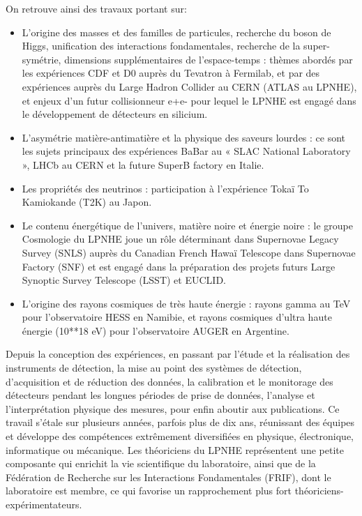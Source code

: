 \documentclass[french,a4paper,12pt]{report}
\begin{document}
  On retrouve ainsi des travaux portant sur:  
  \begin{itemize}
  \item L'origine des masses et des familles de particules, recherche du boson de Higgs, unification des interactions fondamentales, recherche de la super-symétrie, dimensions supplémentaires de l’espace-temps : thèmes abordés par les expériences CDF et D0 auprès du Tevatron à Fermilab, et par des expériences auprès du Large Hadron Collider au CERN (ATLAS au LPNHE), et enjeux d’un futur collisionneur e+e- pour lequel le LPNHE est engagé dans le développement de détecteurs en silicium.
  
  \item L’asymétrie matière-antimatière et la physique des saveurs lourdes : ce sont les sujets principaux des expériences BaBar au « SLAC National Laboratory », LHCb au CERN et la future SuperB factory en Italie.
  
  \item Les propriétés des neutrinos : participation à l’expérience Tokaï To Kamiokande (T2K) au Japon.
  
  \item Le contenu énergétique de l’univers, matière noire et énergie noire : le groupe Cosmologie du LPNHE joue un rôle déterminant dans Supernovae Legacy Survey (SNLS) auprès du Canadian French Hawaï Telescope dans Supernovae Factory (SNF) et est engagé dans la préparation des projets futurs Large Synoptic Survey Telescope (LSST) et EUCLID.
  
  \item L'origine des rayons cosmiques de très haute énergie : rayons gamma au TeV pour l’observatoire HESS en Namibie, et rayons cosmiques d’ultra haute énergie (10**18 eV) pour l’observatoire AUGER en Argentine.
  \end{itemize}
  
  Depuis la conception des expériences, en passant par l’étude et la réalisation des instruments de détection, la mise au point des systèmes de détection, d’acquisition et de réduction des données, la calibration et le monitorage des détecteurs pendant les longues périodes de prise de données, l’analyse et l’interprétation physique des mesures, pour enfin aboutir aux publications.
  Ce travail s'étale sur plusieurs années, parfois plus de dix ans, réunissant des équipes et développe des compétences extrêmement diversifiées en physique, électronique, informatique ou mécanique. 
  Les théoriciens du LPNHE représentent une petite composante qui enrichit la vie scientifique du laboratoire, ainsi que de la Fédération de Recherche sur les Interactions Fondamentales (FRIF), dont le laboratoire est membre, ce qui favorise un rapprochement plus fort théoriciens-expérimentateurs.
  
\end{document}
